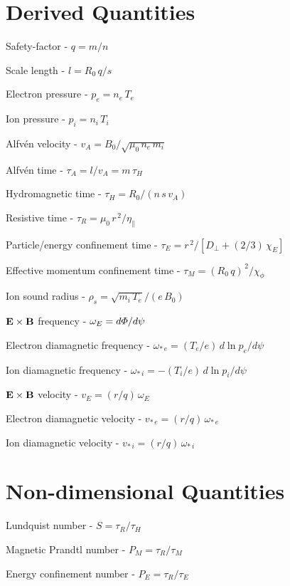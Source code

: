 \documentclass[notitlepage,12pt]{article}
\begin{document}
\section{Derived Quantities}
\begin{description}
\item Safety-factor - $q=m/n$
\item Scale length - $l = R_0\,q/s$ 
\item Electron pressure - $p_e = n_e\,T_e$
\item Ion pressure - $p_i = n_i\,T_i$
\item Alfv\'{e}n velocity - $v_A = B_0/\sqrt{\mu_0\,n_e\,m_i}$
\item Alfv\'{e}n time - $\tau_A= l/v_A =m\,\tau_H$
\item Hydromagnetic time - $\tau_H =R_0/(n\,s\,v_A)$
\item Resistive time - $\tau_R = \mu_0\,r^{\,2}/\eta_\parallel$
\item Particle/energy confinement time - $\tau_E= r^{\,2}/[D_\perp + (2/3)\,\chi_E]$
\item Effective momentum confinement time - $\tau_M = (R_0\,q)^{\,2}/\chi_\phi$
\item Ion sound radius - $\rho_s = \sqrt{m_i\,T_e}/(e\,B_0)$
\item ${\bf E}\times {\bf B}$ frequency - $\omega_E = d{\mit\Phi}/d\psi$
\item Electron diamagnetic frequency - $\omega_{\ast\,e} = (T_e/e)\,d\ln p_e/d\psi$
\item Ion diamagnetic frequency - $\omega_{\ast\,i} =- (T_i/e)\,d\ln p_i/d\psi$
\item ${\bf E}\times {\bf B}$ velocity - $v_E = (r/q)\,\omega_E$
\item Electron diamagnetic velocity -  $v_{\ast\,e} = (r/q)\,\omega_{\ast\,e}$
\item Ion diamagnetic velocity -  $v_{\ast\,i} = (r/q)\,\omega_{\ast\,i}$
\end{description}

\section{Non-dimensional Quantities}
\begin{description}
\item Lundquist number - $S=\tau_R/\tau_H$
\item Magnetic Prandtl number - $P_M = \tau_R/\tau_M$
\item Energy confinement number - $P_E = \tau_R/\tau_E$
\end{description}
\end{document}
